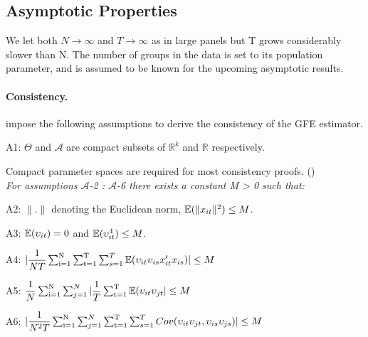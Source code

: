 \subsection{Asymptotic Properties}
We let both $N \rightarrow \infty$ and $T \rightarrow \infty$ as in large panels but T grows considerably slower than N.
The number of groups in the data is set to its population parameter, %
and is assumed to be known for the upcoming asymptotic results. 

\paragraph{Consistency.}
\textcite{bonhomme2015grouped} impose the following assumptions to derive the consistency of the GFE estimator.
\begin{assumption} A1: $\Theta$ and $\mathcal{A}$ are compact subsets of $\mathbb{R}^k$ and $\mathbb{R}$ respectively.
\end{assumption}
Compact parameter spaces are required for most consistency proofs. (\cite{freyberger2019practical}) \\
\textit{For assumptions  $\mathcal{A}$-2 : $\mathcal{A}$-6 there exists a constant M > 0 such that:}
\begin{assumption} A2: $\lVert . \rVert$ denoting the Euclidean norm, $\operatorname{\mathbb{E}}(\lVert  x_{it} \rVert^2) \le M$.
\end{assumption}
\begin{assumption} A3: $\operatorname{\mathbb{E}}(\upsilon_{it}) = 0 $ and $\operatorname{\mathbb{E}}(\upsilon_{it}^4) \le M$.
\end{assumption}
\begin{assumption} A4: $| \dfrac{1}{NT} \operatorname*{\sum_{i=1}^N} \operatorname*{\sum_{t=1}^T} \sum_{s=1}^T \operatorname{\mathbb{E}}(\upsilon_{it}\upsilon_{is}x_{it}'x_{is}) | \le M $ 
\end{assumption}
\begin{assumption} A5: $\dfrac{1}{N} \operatorname*{\sum_{i=1}^N} \sum_{j=1}^N | \dfrac{1}{T}\operatorname*{\sum_{t=1}^T} \operatorname{\mathbb{E}}(\upsilon_{it}\upsilon_{jt}| \le M $ 
\end{assumption}
\begin{assumption} A6: $| \dfrac{1}{N^2T} \operatorname*{\sum_{i=1}^N} \sum_{j=1}^N \operatorname*{\sum_{t=1}^T} \sum_{s=1}^T Cov(\upsilon_{it}\upsilon_{jt}, \upsilon_{is}\upsilon_{js}) | \le M $ 
\end{assumption}

